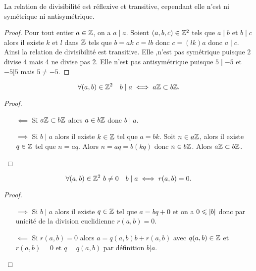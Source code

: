 \begin{prop}
  La relation de divisibilité est réflexive et transitive, cependant elle n'est 
  ni symétrique ni antisymétrique.
\end{prop}
\begin{proof}
  Pour tout entier \(a \in \mathbb{Z}\), on a \(a\mid a\). Soient \((a,b,c) \in \mathbb{Z}^2\) 
  tels que \(a\mid b\) et \(b\mid c\) alors il existe \(k\) et \(l\) dans \(\mathbb{Z}\) 
  tels que \(b=ak\) \(c=lb\) donc \(c=(lk)a\) donc \(a\mid c\). Ainsi la 
  relation de divisibilité est transitive. Elle ,n'est pas symétrique puisque 2 
  divise 4 mais 4 ne divise pas 2. Elle n'est pas antisymétrique puisque \(5\mid 
  -5\) et \(-5[5\) mais \(5 \neq -5\).
\end{proof}
\begin{prop}
  \begin{equation}
    \forall (a,b) \in \mathbb{Z}^2 \quad b\mid a \iff a\mathbb{Z} \subset b\mathbb{Z}.
  \end{equation}
\end{prop}
\begin{proof}
  \begin{itemize}
    \item[\(\impliedby\)] Si \(a\mathbb{Z} \subset b\mathbb{Z}\) alors \(a \in b\mathbb{Z}\) donc 
      \(b\mid a\).
    \item[\(\implies\)] Si \(b\mid a\) alors il existe \(k \in \mathbb{Z}\) tel que 
      \(a=bk\). Soit \(n \in a\mathbb{Z}\), alors il existe \(q \in \mathbb{Z}\) tel que 
      \(n=aq\). Alors \(n=aq=b(kq)\) donc \(n \in b\mathbb{Z}\). Alors \(a\mathbb{Z} \subset 
      b\mathbb{Z}\).
  \end{itemize}
\end{proof}
\begin{prop}
  \begin{equation}
    \forall (a,b) \in \mathbb{Z}^2 \ b\neq 0 \quad b\mid a \iff r(a,b)=0.
  \end{equation}
\end{prop}
\begin{proof}
  \begin{itemize}
    \item[\(\implies\)] Si \(b\mid a\) alors il existe \(q \in \mathbb{Z}\) tel que 
      \(a=bq+0\) et on a \(0\leqslant \left\lvert b\right\rvert\) donc par unicité de la division 
      euclidienne \(r(a,b)=0\).
    \item[\(\impliedby\)] Si \(r(a,b)=0\) alors \(a=q(a,b) b+r(a,b)\) avec 
      \(q(a,b) \in \mathbb{Z}\) et \(r(a,b)=0\) et \(q=q(a,b)\) par définition \(b|a\).
  \end{itemize}
\end{proof}

